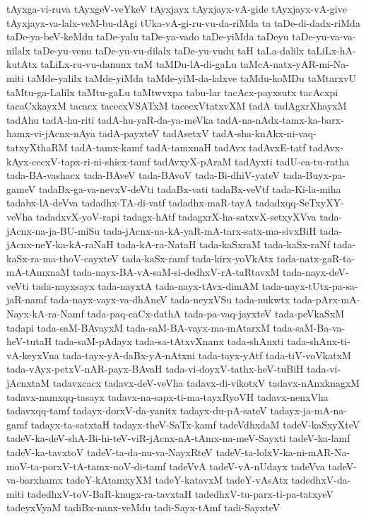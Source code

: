 {tAyxga-vi-ruva
tAyxgeV-veYkeV
tAyxjayx
tAyxjayx-vA-gide
tAyxjayx-vA-give
tAyxjayx-va-lalx-veM-bu-dAgi
tUka-vA-gi-ru-vu-da-riMda
ta
taDe-di-dadx-riMda
taDe-ya-beV-keMdu
taDe-yalu
taDe-ya-vado
taDe-yiMda
taDeyu
taDe-yu-va-va-nilalx
taDe-yu-venu
taDe-yu-vu-dilalx
taDe-yu-vudu
taH
taLa-dalilx
taLiLx-hA-kutAtx
taLiLx-ru-vu-danunx
taM
taMDu-lA-di-gaLu
taMcA-natx-yAR-mi-Na-miti
taMde-yalilx
taMde-yiMda
taMde-yiM-da-lalxve
taMdu-koMDu
taMtarxvU
taMtu-ga-Lalilx
taMtu-gaLu
taMtwvxpa
tabu-lar
tacAcx-payxsutx
tacAcxpi
tacaCxkayxM
tacacx
tacecxVSATxM
tacecxVtatxvXM
tadA
tadAgxrXhayxM
tadAhu
tadA-hu-riti
tadA-hu-yaR-da-ya-meVka
tadA-na-nAdx-tamx-ka-barx-hamx-vi-jAcnx-nAya
tadA-payxteV
tadAsetxV
tadA-sha-knAkx-ni-vaq-tatxyXthaRM
tadA-tamx-kamf
tadA-tamxnaH
tadAvx
tadAvxE-tatf
tadAvx-kAyx-cecxV-tapx-ri-ni-shicx-tamf
tadAvxyX-pAraM
tadAyxti
tadU-ca-tu-ratha
tada-BA-vashacx
tada-BAveV
tada-BAvoV
tada-Bi-dhiV-yateV
tada-Buyx-pa-gameV
tadaBx-ga-va-nevxV-deVti
tadaBx-vati
tadaBx-veVtf
tada-Ki-la-miha
tadabx-lA-deVva
tadadhx-TA-di-vatf
tadadhx-maR-tayA
tadadxqq-SeTxyXY-veVha
tadadxvX-yoV-rapi
tadagx-hAtf
tadagxrX-ha-satxvX-setxyXVva
tada-jAcnx-na-ja-BU-miSu
tada-jAcnx-na-kA-yaR-mA-tarx-satx-ma-sivxBiH
tada-jAcnx-neY-ka-kA-raNaH
tada-kA-ra-NataH
tada-kaSxraM
tada-kaSx-raNf
tada-kaSx-ra-ma-thoV-cayxteV
tada-kaSx-ramf
tada-kirx-yoVkAtx
tada-natx-gaR-ta-mA-tAmxnaM
tada-nayx-BA-vA-saM-si-dedhxV-rA-taRtavxM
tada-nayx-deV-veVti
tada-nayxsayx
tada-nayxtA
tada-nayx-tAvx-dimAM
tada-nayx-tUtx-pa-sa-jaR-namf
tada-nayx-vayx-va-dhAneV
tada-neyxVSu
tada-nukwtx
tada-pArx-mA-Nayx-kA-ra-Namf
tada-paq-caCx-dathA
tada-pa-vaq-jayxteV
tada-peVkaSxM
tadapi
tada-saM-BAvayxM
tada-saM-BA-vayx-ma-mAtarxM
tada-saM-Ba-va-heV-tutaH
tada-saM-pAdayx
tada-sa-tAtxvXnanx
tada-shAnxti
tada-shAnx-ti-vA-keyxVna
tada-tayx-yA-daBx-yA-nAtxni
tada-tayx-yAtf
tada-tiV-voVkatxM
tada-vAyx-petxV-nAR-payx-BAvaH
tada-vi-doyxV-tathx-heV-tuBiH
tada-vi-jAcnxtaM
tadavxcacx
tadavx-deV-veVha
tadavx-di-vikotxV
tadavx-nAnxknagxM
tadavx-namxqq-tasayx
tadavx-na-sapx-ti-ma-tayxRyoVH
tadavx-nenxVha
tadavxqq-tamf
tadayx-dorxV-da-yanitx
tadayx-du-pA-sateV
tadayx-ja-mA-na-gamf
tadayx-ta-satxtaH
tadayx-theV-SaTx-kamf
tadeVdhxdaM
tadeV-kaSxyXteV
tadeV-ka-deV-shA-Bi-hi-teV-viR-jAcnx-nA-tAmx-na-meV-Sayxti
tadeV-ka-lamf
tadeV-ka-tavxtoV
tadeV-ta-da-nu-va-NayxRteV
tadeV-ta-lolxV-ka-ni-mAR-Na-moV-ta-porxV-tA-tamx-noV-di-tamf
tadeVvA
tadeV-vA-nUdayx
tadeVva
tadeV-va-barxhamx
tadeY-kAtamxyXM
tadeY-katavxM
tadeY-vAsAtx
tadedhxV-da-miti
tadedhxV-toV-BaR-knugx-ra-tavxtaH
tadedhxV-tu-parx-ti-pa-tatxyeV
tadeyxVyaM
tadiBx-nanx-veMdu
tadi-Sayx-tAmf
tadi-SayxteV
}
